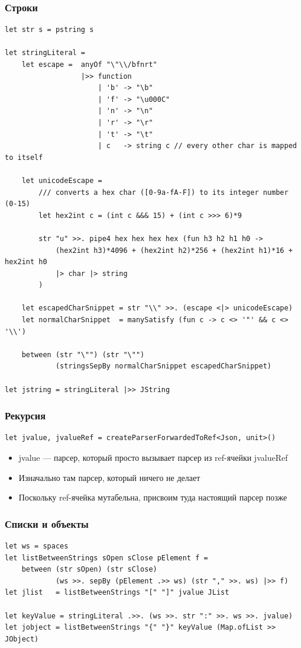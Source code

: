 \documentclass[xetex,mathserif,serif]{beamer}
\begin{document}
	\begin{frame}[fragile]
		\frametitle{Строки}
		\begin{tiny}
			\begin{verbatim}
let str s = pstring s

let stringLiteral =
    let escape =  anyOf "\"\\/bfnrt"
                  |>> function
                      | 'b' -> "\b"
                      | 'f' -> "\u000C"
                      | 'n' -> "\n"
                      | 'r' -> "\r"
                      | 't' -> "\t"
                      | c   -> string c // every other char is mapped to itself

    let unicodeEscape =
    	/// converts a hex char ([0-9a-fA-F]) to its integer number (0-15)
        let hex2int c = (int c &&& 15) + (int c >>> 6)*9

        str "u" >>. pipe4 hex hex hex hex (fun h3 h2 h1 h0 ->
            (hex2int h3)*4096 + (hex2int h2)*256 + (hex2int h1)*16 + hex2int h0
            |> char |> string
        )

    let escapedCharSnippet = str "\\" >>. (escape <|> unicodeEscape)
    let normalCharSnippet  = manySatisfy (fun c -> c <> '"' && c <> '\\')

    between (str "\"") (str "\"")
            (stringsSepBy normalCharSnippet escapedCharSnippet)

let jstring = stringLiteral |>> JString
			\end{verbatim}
		\end{tiny}
	\end{frame}

	\begin{frame}[fragile]
		\frametitle{Рекурсия}
		\begin{verbatim}
let jvalue, jvalueRef = createParserForwardedToRef<Json, unit>()
		\end{verbatim}
		\begin{itemize}
			\item jvalue --- парсер, который просто вызывает парсер из ref-ячейки jvalueRef
			\item Изначально там парсер, который ничего не делает
			\item Поскольку ref-ячейка мутабельна, присвоим туда настоящий парсер позже
		\end{itemize}
	\end{frame}

	\begin{frame}[fragile]
		\frametitle{Списки и объекты}
		\begin{verbatim}
let ws = spaces
let listBetweenStrings sOpen sClose pElement f =
    between (str sOpen) (str sClose)
            (ws >>. sepBy (pElement .>> ws) (str "," >>. ws) |>> f)
let jlist   = listBetweenStrings "[" "]" jvalue JList

let keyValue = stringLiteral .>>. (ws >>. str ":" >>. ws >>. jvalue)
let jobject = listBetweenStrings "{" "}" keyValue (Map.ofList >> JObject)
		\end{verbatim}
	\end{frame}
\end{document}

